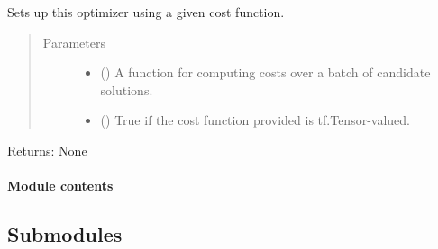 \documentclass[letterpaper,10pt,english,openany,oneside]{sphinxmanual}
\begin{document}
\begin{fulllineitems}
\begin{fulllineitems}
\end{fulllineitems}


\begin{fulllineitems}
\label{\detokenize{_modules/misc.optimizers:misc.optimizers.random.RandomOptimizer.setup}}
Sets up this optimizer using a given cost function.
\begin{quote}\begin{description}
\item[{Parameters}] \leavevmode\begin{itemize}
\item {} 
 () \textendash{} A function for computing costs over a batch of candidate solutions.

\item {} 
 () \textendash{} True if the cost function provided is tf.Tensor-valued.

\end{itemize}

\end{description}\end{quote}

Returns: None

\end{fulllineitems}


\end{fulllineitems}



\paragraph{Module contents}
\label{\detokenize{_modules/misc.optimizers:module-misc.optimizers}}\label{\detokenize{_modules/misc.optimizers:module-contents}}

\subsection{Submodules}
\label{\detokenize{_modules/misc:submodules}}
\end{document}

